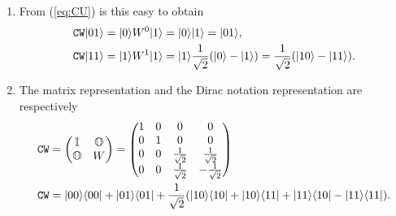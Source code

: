 \begin{footnotesize}
\begin{solution}
\begin{enumerate}
\item From (\ref{eq:CU}) is this easy to obtain
\begin{subequations}
\begin{align}
\mathtt{CW}\vert01\rangle & =\vert0\rangle W^0 \vert1\rangle=\vert0\rangle\vert1\rangle=\vert01\rangle,\\
\mathtt{CW}\vert11\rangle & =\vert1\rangle W^1 \vert1\rangle=\vert1\rangle\frac{1}{\sqrt{2}}
(\vert0\rangle-\vert1\rangle)= \frac{1}{\sqrt{2}}(\vert10\rangle-\vert11\rangle).
\end{align}
\end{subequations}
\item The matrix representation and the Dirac notation representation are
respectively
\begin{subequations}
\begin{align}
 \mathtt{CW} & =\begin{pmatrix}\mathbb{I} & \mathbb{O}\\
 \mathbb{O} & W\end{pmatrix}
=\begin{pmatrix} 1 & 0 & 0 & 0\\0 & 1 & 0 & 0\\
     0 & 0 & \frac{1}{\sqrt{2}} & \frac{1}{\sqrt{2}}\\
     0 & 0 & \frac{1}{\sqrt{2}} & -\frac{1}{\sqrt{2}}
    \end{pmatrix}\\
\mathtt{CW} &
=\vert00\rangle\langle00\vert+\vert01\rangle\langle01\vert+\frac{1}{\sqrt{2}}(\vert10\rangle\langle10\vert+
\vert10\rangle\langle11\vert+\vert11\rangle\langle10\vert-\vert11\rangle\langle11\vert).
\end{align}
\end{subequations}
\end{enumerate}
\end{solution}
\end{footnotesize}

